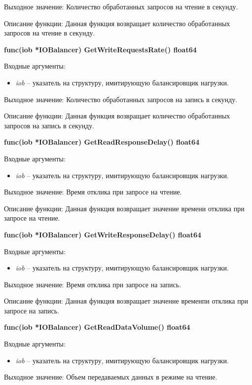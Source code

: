 Выходное значение: Количество обработанных запросов на чтение в секунду.

Описание функции: Данная функция возвращает количество обработанных запросов на чтение в секунду.

\textbf{func(iob *IOBalancer) GetWriteRequestsRate() float64}

Входные аргументы:
\begin{itemize}
	\item \textit{iob} -- указатель на структуру, имитирующую балансировщик нагрузки. 
\end{itemize}

Выходное значение: Количество обработанных запросов на запись в секунду. 

Описание функции: Данная функция возвращает количество обработанных запросов на запись в секунду.

\textbf{func(iob *IOBalancer) GetReadResponseDelay() float64}

Входные аргументы:
\begin{itemize}
	\item \textit{iob} -- указатель на структуру, имитирующую балансировщик нагрузки. 
\end{itemize}

Выходное значение: Время отклика при запросе на чтение. 

Описание функции: Данная функция возвращает значение времени отклика при запросе на чтение.

\textbf{func(iob *IOBalancer) GetWriteResponseDelay() float64}

Входные аргументы:
\begin{itemize}
	\item \textit{iob} -- указатель на структуру, имитирующую балансировщик нагрузки. 
\end{itemize}

Выходное значение: Время отклика при запросе на запись.

Описание функции: Данная функция возвращает значение временпи отклика при запросе на запись.

\textbf{func(iob *IOBalancer) GetReadDataVolume() float64}

Входные аргументы:
\begin{itemize}
	\item \textit{iob} -- указатель на структуру, имитирующую балансировщик нагрузки. 
\end{itemize}

Выходное значение: Объем передаваемых данных в режиме на чтение.

